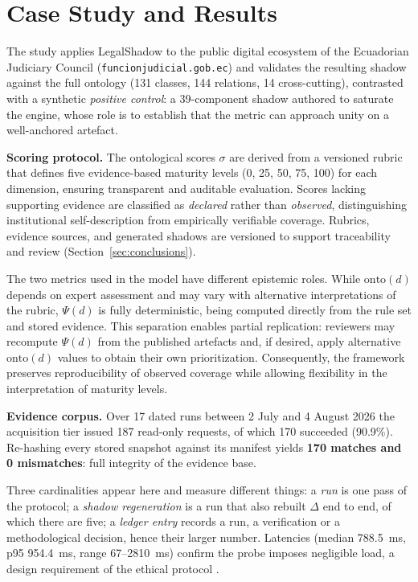 \documentclass[engproc,proceedingpaper,submit,moreauthors]{Definitions/mdpi}
\begin{document}
\section{Case Study and Results}
\label{sec:results}
    The study applies LegalShadow to the public digital ecosystem of the Ecuadorian Judiciary Council (\texttt{funcionjudicial\-.gob\-.ec}) and validates the resulting shadow against the full ontology (131 classes, 144 relations, 14 cross-cutting), contrasted with a synthetic \emph{positive control}: a 39-component shadow authored to saturate the engine, whose role is to establish that the metric can approach unity on a well-anchored artefact.
    
    \textbf{Scoring protocol.} 
    The ontological scores $\sigma$ are derived from a versioned rubric that defines five evidence-based maturity levels (0, 25, 50, 75, 100) for each dimension, ensuring transparent and auditable evaluation. Scores lacking supporting evidence are classified as \emph{declared} rather than \emph{observed}, distinguishing institutional self-description from empirically verifiable coverage. Rubrics, evidence sources, and generated shadows are versioned to support traceability and review (Section~\ref{sec:conclusions}).

    The two metrics used in the model have different epistemic roles. While $\mathrm{onto}(d)$ depends on expert assessment and may vary with alternative interpretations of the rubric, $\Psi(d)$ is fully deterministic, being computed directly from the rule set and stored evidence. This separation enables partial replication: reviewers may recompute $\Psi(d)$ from the published artefacts and, if desired, apply alternative $\mathrm{onto}(d)$ values to obtain their own prioritization. Consequently, the framework preserves reproducibility of observed coverage while allowing flexibility in the interpretation of maturity levels.

    \textbf{Evidence corpus.} 
    Over 17 dated runs between 2 July and 4 August 2026 the acquisition tier issued 187 read-only requests, of which 170 succeeded (90.9\%). Re-hashing every stored snapshot against its manifest yields \textbf{170 matches and 0 mismatches}: full integrity of the evidence base.
    
    Three cardinalities appear here and measure different things: a \emph{run} is one pass of the protocol; a \emph{shadow regeneration} is a run that also rebuilt $\Delta$ end to end, of which there are five; a \emph{ledger entry} records a run, a verification or a methodological decision, hence their larger number. Latencies (median 788.5~ms, p95 954.4~ms, range 67--2810~ms) confirm the probe imposes negligible load, a design requirement of the ethical protocol \cite{Krotov2020}.
\end{document}
